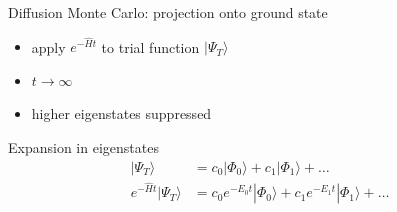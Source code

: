 \begin{frame}{Diffusion Monte Carlo: projection onto ground state}

\begin{minipage}[t]{.45\textwidth}
\vspace{-1em}
\begin{itemize}[leftmargin=0em]
\item apply $e^{-\hat{H}t}$ to trial function $|\Psi_T\rangle$
\item $t\rightarrow\infty$
\item higher eigenstates suppressed
\end{itemize}

\pagehline

Expansion in eigenstates
\vspace{-1ex}
\begin{align*}
|\Psi_T\rangle &= c_0 |\Phi_0\rangle + c_1 |\Phi_1\rangle + \ldots \\
e^{-\hat{H}t}|\Psi_T\rangle &= c_0 e^{-E_0t}|\Phi_0\rangle + c_1  e^{-E_1t}|\Phi_1\rangle + \ldots
\end{align*}
\end{minipage}
\end{frame}


